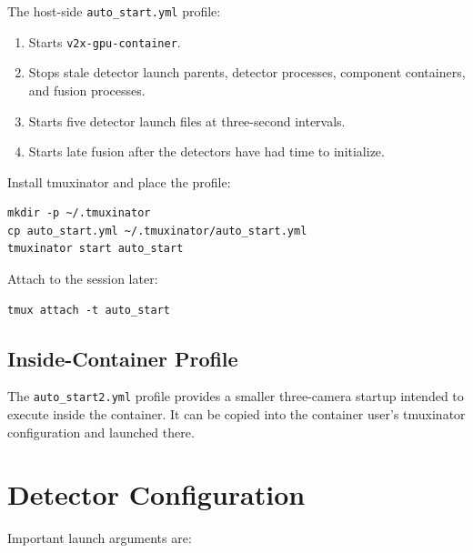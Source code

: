 \documentclass[11pt,a4paper]{article}
\begin{document}
The host-side \texttt{auto\_start.yml} profile:

\begin{enumerate}
  \item Starts \texttt{v2x-gpu-container}.
  \item Stops stale detector launch parents, detector processes, component containers, and fusion processes.
  \item Starts five detector launch files at three-second intervals.
  \item Starts late fusion after the detectors have had time to initialize.
\end{enumerate}

Install tmuxinator and place the profile:

\begin{lstlisting}
mkdir -p ~/.tmuxinator
cp auto_start.yml ~/.tmuxinator/auto_start.yml
tmuxinator start auto_start
\end{lstlisting}

Attach to the session later:

\begin{lstlisting}
tmux attach -t auto_start
\end{lstlisting}

\subsection{Inside-Container Profile}

The \texttt{auto\_start2.yml} profile provides a smaller three-camera startup intended to execute inside the container. It can be copied into the container user's tmuxinator configuration and launched there.

\section{Detector Configuration}

Important launch arguments are:
\end{document}
